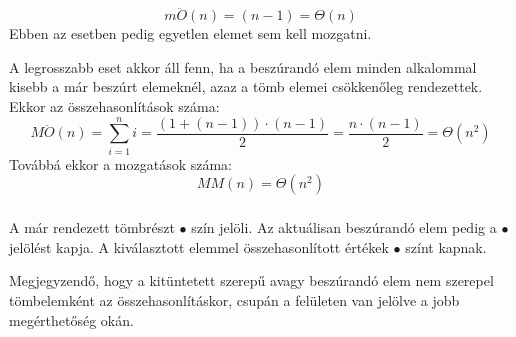 \documentclass{elteikthesis}
\newcommand{\hiddensubsubsection}[1]{
	\stepcounter{subsubsection}
	\subsubsection*{\hspace{1em}{#1}}
}
\begin{document}
$$m\ddot{O}(n)=(n-1)=\Theta(n)$$
Ebben az esetben pedig egyetlen elemet sem kell mozgatni.\par
A legrosszabb eset akkor áll fenn, ha a beszúrandó elem minden alkalommal kisebb a már beszúrt elemeknél, azaz a tömb elemei csökkenőleg rendezettek\cite{Fekete}. Ekkor az összehasonlítások száma:
$$M\ddot{O}(n)=\sum\limits_{i=1}^n i = \frac{(1+(n-1))\cdot(n-1)}{2}=\frac{n\cdot(n-1)}{2}=\Theta(n^2)$$
Továbbá ekkor a mozgatások száma:
$$MM(n)=\Theta(n^2)$$
\hiddensubsubsection{Jelölések az állapotjelző felületen}
A már rendezett tömbrészt \textcolor{done}{\Huge$\bullet$} szín jelöli. Az aktuálisan beszúrandó elem pedig a \textcolor{select}{\Huge$\bullet$} jelölést kapja. A kiválasztott elemmel összehasonlított értékek \textcolor{swap}{\Huge$\bullet$} színt kapnak.\par
Megjegyzendő, hogy a kitüntetett szerepű avagy beszúrandó elem nem szerepel tömbelemként az összehasonlításkor, csupán a felületen van jelölve a jobb megérthetőség okán.
\end{document}
